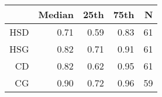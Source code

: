 \begin{tabular}{rrrrr}
\hline
 & Median & 25th & 75th & N \\ 
\hline
HSD & 0.71 & 0.59 & 0.83 & 61 \\ 
HSG & 0.82 & 0.71 & 0.91 & 61 \\ 
CD & 0.82 & 0.62 & 0.95 & 61 \\ 
CG & 0.90 & 0.72 & 0.96 & 59 \\ 
\hline
\end{tabular}%
